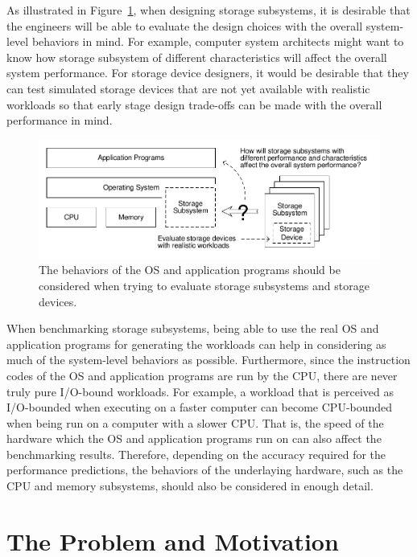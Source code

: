 As illustrated in Figure~\ref{fig:full-system workload}, when designing storage subsystems, it is desirable that the engineers will be able to evaluate the design choices with the overall system-level behaviors in mind. For example, computer system architects might want to know how storage subsystem of different characteristics will affect the overall system performance. For storage device designers, it would be desirable that they can test simulated storage devices that are not yet available with realistic workloads so that early stage design trade-offs can be made with the overall performance in mind.

\begin{figure}[htpb]
	\centering
	\includegraphics[width=\textwidth]{figures/Full-system.pdf}
	\caption[Evaluating storage subsystems in full-system context.]{\label{fig:full-system workload}The behaviors of the OS and application programs should be considered when trying to evaluate storage subsystems and storage devices.}
\end{figure}

When benchmarking storage subsystems, being able to use the real OS and application programs for generating the workloads can help in considering as much of the system-level behaviors as possible. Furthermore, since the instruction codes of the OS and application programs are run by the CPU, there are never truly pure I/O-bound workloads. For example, a workload that is perceived as I/O-bounded when executing on a faster computer can become CPU-bounded when being run on a computer with a slower CPU. That is, the speed of the hardware which the  OS and application programs run on can also affect the benchmarking results. Therefore, depending on the accuracy required for the performance predictions, the behaviors of the underlaying hardware, such as the CPU and memory subsystems, should also be considered in enough detail.

\section{The Problem and Motivation}

